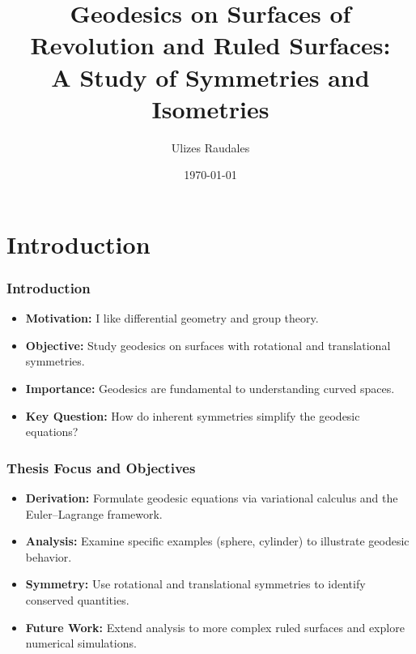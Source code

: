 \documentclass[12pt]{beamer}
\title[Geodesics on Surfaces]{Geodesics on Surfaces of Revolution and Ruled Surfaces: \\ A Study of Symmetries and Isometries}
\author{Ulizes Raudales}
\date{\today}
\begin{document}
\begin{frame}
  \titlepage
\end{frame}

\section{Introduction}
\begin{frame}
  \frametitle{Introduction}
  \begin{itemize}
    \item \textbf{Motivation:} I like differential geometry and group theory.
    \item \textbf{Objective:} Study geodesics on surfaces with rotational and translational symmetries.
    \item \textbf{Importance:} Geodesics are fundamental to understanding curved spaces.
    \item \textbf{Key Question:} How do inherent symmetries simplify the geodesic equations?
  \end{itemize}
\end{frame}

\begin{frame}
  \frametitle{Thesis Focus and Objectives}
  \begin{itemize}
    \item \textbf{Derivation:} Formulate geodesic equations via variational calculus and the Euler--Lagrange framework.
    \item \textbf{Analysis:} Examine specific examples (sphere, cylinder) to illustrate geodesic behavior.
    \item \textbf{Symmetry:} Use rotational and translational symmetries to identify conserved quantities.
    \item \textbf{Future Work:} Extend analysis to more complex ruled surfaces and explore numerical simulations.
  \end{itemize}
\end{frame}

\end{document}
